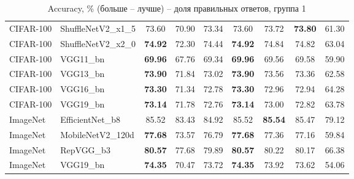 \begin{table}[h!]
{\begin{tabular}{llccccccc}
CIFAR-100 & ShuffleNetV2\_x1\_5 &                  73.60 &                  70.90 &                  73.34 &                  73.60 &                  73.72 & \textbf{73.80} &                  61.30 \\
CIFAR-100 & ShuffleNetV2\_x2\_0 & \textbf{74.92} &                  72.30 &                  74.44 & \textbf{74.92} &                  74.84 &                  74.82 &                  63.04 \\
CIFAR-100 &          VGG11\_bn & \textbf{69.96} &                  67.76 &                  69.34 & \textbf{69.96} &                  69.56 &                  69.58 &                  59.90 \\
CIFAR-100 &          VGG13\_bn & \textbf{73.90} &                  71.84 &                  73.02 & \textbf{73.90} &                  73.56 &                  73.36 &                  62.58 \\
CIFAR-100 &          VGG16\_bn & \textbf{73.30} &                  71.34 &                  72.78 & \textbf{73.30} &                  72.96 &                  72.94 &                  64.28 \\
CIFAR-100 &          VGG19\_bn & \textbf{73.14} &                  71.78 &                  72.76 & \textbf{73.14} &                  73.00 &                  72.82 &                  63.78 \\
 ImageNet &   EfficientNet\_b8 &                  85.52 &                  83.43 &                  84.92 &                  85.52 & \textbf{85.54} &                  85.47 &                  79.12 \\
 ImageNet &  MobileNetV2\_120d & \textbf{77.68} &                  73.57 &                  76.79 & \textbf{77.68} &                  77.36 &                  77.16 &                  59.84 \\
 ImageNet &         RepVGG\_b3 & \textbf{80.57} &                  77.68 &                  79.89 & \textbf{80.57} &                  80.22 &                  80.17 &                  66.38 \\
 ImageNet &          VGG19\_bn & \textbf{74.35} &                  70.47 &                  73.72 & \textbf{74.35} &                  73.92 &                  73.62 &                  54.06 \\
\bottomrule
\end{tabular}%
}
\caption{Accuracy, \% (больше -- лучше) -- доля правильных ответов, группа 1}
\label{tab:metrics:ACC_1}
\end{table}
